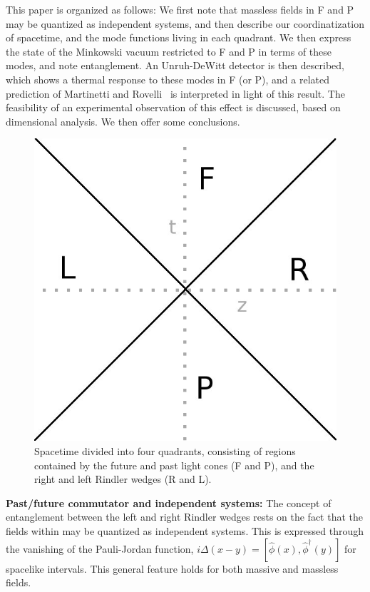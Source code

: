 \documentclass[aps,prl,showpacs,12pt]{revtex4}
\begin{document}
This paper is organized as follows:  We first note that massless fields in F and P may be quantized as independent systems, and then describe our coordinatization of spacetime, and the mode functions living in each quadrant.  We then express the state of the Minkowski vacuum restricted to F and P in terms of these modes, and note entanglement.  An Unruh-DeWitt detector is then described, which shows a thermal response to these modes in F (or P), and a related prediction of Martinetti and Rovelli~\cite{rovelli10} is interpreted in light of this result.  The feasibility of an experimental observation of this effect is discussed, based on dimensional analysis.  We then offer some conclusions.

\begin{figure}
 \centering
 \includegraphics[scale=0.25]{spacetime.jpg}
 \caption{Spacetime divided into four quadrants, consisting of regions contained by the future and past light cones (F and P), and the right and left Rindler wedges (R and L).}
 \label{fig:  Quadrants of Minkowski spacetime}
\end{figure}


\textbf{Past/future commutator and independent systems:}  The concept of entanglement between the left and right Rindler wedges rests on the fact that the fields within may be quantized as independent systems.  This is expressed through the vanishing of the Pauli-Jordan function, $i \Delta (x - y) = [\hat{\phi}(x) , \hat{\phi}^{\dagger}(y)]$ for spacelike intervals.  This general feature holds for both massive and massless fields.
\end{document}
